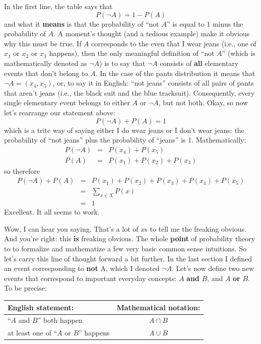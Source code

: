 \documentclass[
  letterpaper,
  DIV=11,
  numbers=noendperiod]{scrreprt}
\begin{document}
In the first line, the table says that \[P(\neg A) = 1- P(A)\] and what
it \textbf{means} is that the probability of ``not \(A\)'' is equal to 1
minus the probability of \(A\). A moment's thought (and a tedious
example) make it obvious why this must be true. If \(A\) corresponds to
the even that I wear jeans (i.e., one of \(x_1\) or \(x_2\) or \(x_3\)
happens), then the only meaningful definition of ``not \(A\)'' (which is
mathematically denoted as \(\neg A\)) is to say that \(\neg A\) consists
of \textbf{all} elementary events that don't belong to \(A\). In the
case of the pants distribution it means that \(\neg A = (x_4, x_5)\),
or, to say it in English: ``not jeans'' consists of all pairs of pants
that aren't jeans (i.e., the black suit and the blue tracksuit).
Consequently, every single elementary event belongs to either \(A\) or
\(\neg A\), but not both. Okay, so now let's rearrange our statement
above: \[P(\neg A) + P(A) = 1\] which is a trite way of saying either I
do wear jeans or I don't wear jeans: the probability of ``not jeans''
plus the probability of ``jeans'' is 1. Mathematically:
\[\begin{array}{rcl}
P(\neg A) &=&  P(x_4) + P(x_5) \\
P(A) &=& P(x_1) + P(x_2) + P(x_3) 
\end{array}\] so therefore \[\begin{array}{rcl} 
P(\neg A) + P(A) &=& P(x_1) + P(x_2) + P(x_3) + P(x_4) + P(x_5) \\
&=& \sum_{x \in X} P(x) \\
&=& 1
\end{array}\] Excellent. It all seems to work.

Wow, I can hear you saying. That's a lot of \(x\)s to tell me the
freaking obvious. And you're right: this \textbf{is} freaking obvious.
The whole \textbf{point} of probability theory to to formalize and
mathematize a few very basic common sense intuitions. So let's carry
this line of thought forward a bit further. In the last section I
defined an event corresponding to \textbf{not} A, which I denoted
\(\neg A\). Let's now define two new events that correspond to important
everyday concepts: \(A\) \textbf{and} \(B\), and \(A\) \textbf{or}
\(B\). To be precise:

\begin{longtable}[]{@{}lc@{}}
\toprule\noalign{}
English statement: & Mathematical notation: \\
\midrule\noalign{}
\endhead
\bottomrule\noalign{}
\endlastfoot
``\(A\) and \(B\)'' both happen & \(A \cap B\) \\
at least one of ``\(A\) or \(B\)'' happens & \(A \cup B\) \\
\end{longtable}
\end{document}
